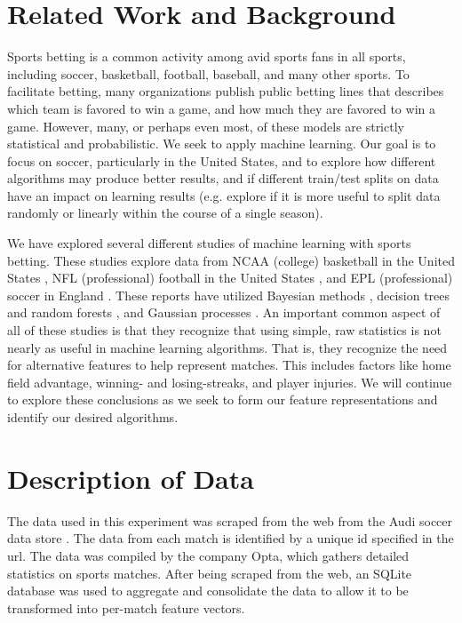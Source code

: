 \section {Related Work and Background}
Sports betting is a common activity among avid sports fans in all sports, including soccer, basketball, football, baseball, and many other sports. To facilitate betting, many organizations publish public betting lines that describes which team is favored to win a game, and how much they are favored to win a game. However, many, or perhaps even most, of these models are strictly statistical and probabilistic. We seek to apply machine learning. Our goal is to focus on soccer, particularly in the United States, and to explore how different algorithms may produce better results, and if different train/test splits on data have an impact on learning results (e.g. explore if it is more useful to split data randomly or linearly within the course of a single season).

We have explored several different studies of machine learning with sports betting. These studies explore data from NCAA (college) basketball in the United States \cite{zimmermann2013predicting}, NFL (professional) football in the United States \cite{warner2010predicting}, and EPL (professional) soccer in England \cite{constantinou2012pi}. These reports have utilized Bayesian methods \cite{constantinou2012pi, zimmermann2013predicting}, decision trees and random forests \cite{zimmermann2013predicting}, and Gaussian processes \cite{warner2010predicting}. An important common aspect of all of these studies is that they recognize that using simple, raw statistics is not nearly as useful in machine learning algorithms. That is, they recognize the need for alternative features to help represent matches. This includes factors like home field advantage, winning- and losing-streaks, and player injuries. We will continue to explore these conclusions as we seek to form our feature representations and identify our desired algorithms.

\section {Description of Data}

The data used in this experiment was scraped from the web from the Audi soccer data store \cite{audi}. The data from each match is identified by a unique id specified in the url. The data was compiled by the company Opta, which gathers detailed statistics on sports matches. After being scraped from the web, an SQLite database was used to aggregate and consolidate the data to allow it to be transformed into per-match feature vectors.


